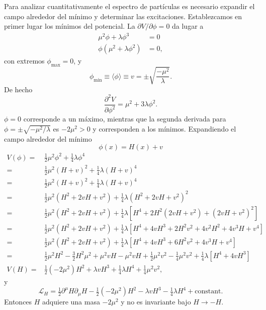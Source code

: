 \begin{frame}
Para analizar cuantitativamente el espectro de partículas es necesario expandir el campo alrededor del mínimo y determinar las excitaciones. Establezcamos en primer lugar los mínimos del potencial. La $\partial V/\partial\phi=0$ da lugar a
\begin{align}
  \mu^2\phi+\lambda\phi^3&=0\\
  \phi(\mu^2+\lambda\phi^2)&=0,
\end{align}
con extremos $\phi_{\text{max}}=0$, y 
\begin{equation}
  \label{eq:90qft}
  \phi_{\text{min}}\equiv\langle\phi\rangle\equiv v=\pm\sqrt{\frac{-\mu^2}{\lambda}}.
\end{equation}
De hecho 
\begin{equation}
  \frac{\partial^2V}{\partial\phi^2}=\mu^2+3\lambda\phi^2.
\end{equation}
$\phi=0$ corresponde a un máximo, mientras que la segunda derivada para $\phi=\pm\sqrt{-\mu^2/\lambda}$ es $-2\mu^2\gt 0$ y corresponden a los mínimos. Expandiendo el campo alrededor del mínimo
\begin{equation}
  \phi(x)=H(x)+v
\end{equation}
\begin{align}
  V(\phi)=&\tfrac{1}{2}\mu^2 \phi^2+\tfrac{1}{4}\lambda\phi^4\nonumber\\
  =&\tfrac{1}{2}\mu^2 (H+v)^2+\tfrac{1}{4}\lambda(H+v)^4\nonumber\\
  =&\tfrac{1}{2}\mu^2 (H+v)^2+\tfrac{1}{4}\lambda(H+v)^4\nonumber\\
  =&\tfrac{1}{2}\mu^2 \left(H^2+2vH+v^2\right)+\tfrac{1}{4}\lambda\left(H^2+2vH+v^2\right)^2\nonumber\\
  =&\tfrac{1}{2}\mu^2 \left(H^2+2vH+v^2\right)+\tfrac{1}{4}\lambda\left[H^4+2H^2\left(2vH+v^2\right)+\left(2vH+v^2\right)^2\right]\nonumber\\
  =&\tfrac{1}{2}\mu^2 \left(H^2+2vH+v^2\right)+\tfrac{1}{4}\lambda\left[H^4+4vH^3+2H^2v^2+4v^2H^2+4v^3H+v^4\right]\nonumber\\
  =&\tfrac{1}{2}\mu^2 \left(H^2+2vH+v^2\right)+\tfrac{1}{4}\lambda\left[H^4+4vH^3+6H^2v^2+4v^3H+v^4\right]\nonumber\\
  =&\tfrac{1}{2}\mu^2H^2-\tfrac{3}{2}H^2\mu^2+\mu^2vH-\mu^2vH+\tfrac{1}{2}\mu^2v^2-\tfrac{1}{4}\mu^2v^2+\tfrac{1}{4}\lambda\left[H^4+4vH^3\right]\nonumber\\
\label{eq:84qft}
V(H)=&\tfrac{1}{2}\left(-2\mu^2\right)H^2+\lambda vH^3+\tfrac{1}{4}\lambda H^4+\tfrac{1}{4}\mu^2v^2,
\end{align}
y
\begin{equation}
  \label{eq:88qft}
  \mathcal{L}_H=\tfrac{1}{2}\partial^\mu H\partial_\mu H-\tfrac{1}{2}\left(-2\mu^2\right)H^2-\lambda vH^3-\tfrac{1}{4}\lambda H^4+\text{constant}.
\end{equation}
Entonces $H$ adquiere una masa $-2\mu^2$ y no es invariante bajo $H\to-H$. 


\end{frame}
